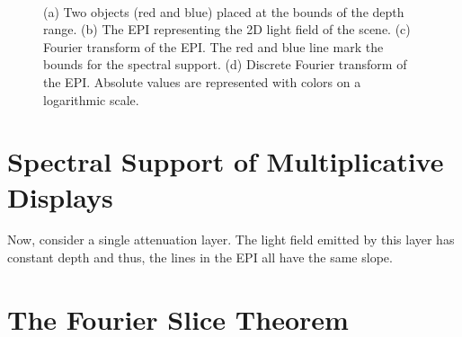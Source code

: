 \begin{figure}[htb]
	\subfigure[]{
		
		\label{fig:two_objects}
	}
	\hfill
	\subfigure[]{
		
		\label{fig:epi_two_objects}
	}
	\hfill
	\subfigure[]{
		
		\label{fig:epi_fourier_transform_1}
	} 
	\\
	\centering
	\caption[Spectral analysis for light fields with bounded depth range]
			{(a) Two objects (red and blue) placed at the bounds of the depth range. 
			 (b) The EPI representing the 2D light field of the scene.
			 (c) Fourier transform of the EPI. 
				 The red and blue line mark the bounds for the spectral support.
			 (d) Discrete Fourier transform of the EPI. 
				 Absolute values are represented with colors on a logarithmic scale.}
\end{figure}

\section{Spectral Support of Multiplicative Displays}
\label{sec:Spectral_Support_for_Display}

Now, consider a single attenuation layer. 
The light field emitted by this layer has constant depth and thus, the lines in the EPI all have the same slope.

\section{The Fourier Slice Theorem}

